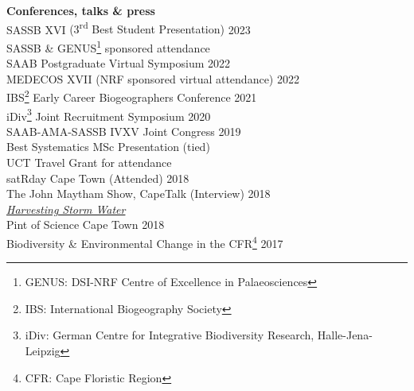 \documentclass[10pt]{article}
\begin{document}
\begin{multicols}{2}
\vfill

\textbf{Conferences, talks \& press} \\ %

SASSB XVI {\small (3\textsuperscript{rd} Best Student Presentation)} \hfill {\small 2023} \\
  \hspace{2em} {\small SASSB \& GENUS\footnote{GENUS: DSI-NRF Centre of Excellence in Palaeosciences} sponsored attendance} \\
SAAB Postgraduate Virtual Symposium                      \hfill {\small 2022} \\
MEDECOS XVII {\small (NRF sponsored virtual attendance)} \hfill {\small 2022} \\
IBS\footnote{IBS: International Biogeography Society}
  Early Career Biogeographers Conference                 \hfill {\small 2021} \\
iDiv\footnote{iDiv: German Centre for Integrative
  Biodiversity Research, Halle-Jena-Leipzig} Joint
  Recruitment Symposium                                  \hfill {\small 2020} \\
SAAB-AMA-SASSB IVXV Joint Congress                       \hfill {\small 2019} \\
  \hspace{2em} {\small Best Systematics MSc Presentation
    (tied)}                                                                   \\
  \hspace{2em} {\small UCT Travel Grant for attendance}                     \\
satRday Cape Town {\small (Attended)}                    \hfill {\small 2018} \\
The John Maytham Show, CapeTalk {\small (Interview)}     \hfill {\small 2018} \\
  \hspace{2em} {\small \href{https://www.capetalk.co.za/articles/328900/harvesting-stormwater-from-liesbeek-river-may-aid-ct-water-supply-students-find}
    {\textit{Harvesting Storm Water}}}                                        \\
Pint of Science Cape Town                                \hfill {\small 2018} \\
Biodiversity \& Environmental Change in the CFR\footnote{
  CFR: Cape Floristic Region}                            \hfill {\small 2017}

\end{multicols} %
\end{document}
